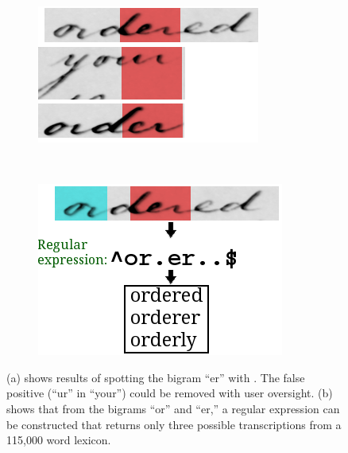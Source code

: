 \documentclass[conference]{IEEEtran}
\begin{document}
\begin{figure}
    \centering
    \begin{subfigure}[t]{0.23\textwidth}
    		\centering
    		\includegraphics[width=\textwidth]{er}
    		\caption{}%
    		\label{fig:spotting_ex}
    	\end{subfigure}
    	~
    	\begin{subfigure}[t]{0.23\textwidth}
    		\centering
    		\includegraphics[width=\textwidth]{regex}
    		\caption{}%
    		\label{fig:list}
    	\end{subfigure}
    	\caption{(a) shows results of spotting the bigram ``er'' with \cite{Almazan2014}. The false positive (``ur'' in ``your'') could be removed with user oversight. (b) shows that from the bigrams ``or'' and ``er,'' a regular expression can be constructed that returns only three possible transcriptions from a 115,000 word lexicon.}
    	\label{fig:spotting}
\end{figure}
\end{document}
